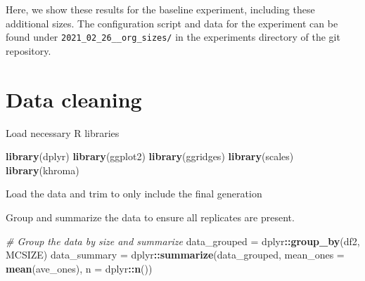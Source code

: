 \documentclass[
]{book}
\newenvironment{Shaded}{\begin{snugshade}}{\end{snugshade}}
\newcommand{\CommentTok}[1]{\textcolor[rgb]{0.56,0.35,0.01}{\textit{#1}}}
\newcommand{\DataTypeTok}[1]{\textcolor[rgb]{0.13,0.29,0.53}{#1}}
\newcommand{\DecValTok}[1]{\textcolor[rgb]{0.00,0.00,0.81}{#1}}
\newcommand{\KeywordTok}[1]{\textcolor[rgb]{0.13,0.29,0.53}{\textbf{#1}}}
\newcommand{\NormalTok}[1]{#1}
\newcommand{\OperatorTok}[1]{\textcolor[rgb]{0.81,0.36,0.00}{\textbf{#1}}}
\newcommand{\StringTok}[1]{\textcolor[rgb]{0.31,0.60,0.02}{#1}}
\begin{document}
Here, we show these results for the baseline experiment, including these additional sizes.
The configuration script and data for the experiment can be found under \texttt{2021\_02\_26\_\_org\_sizes/} in the experiments directory of the git repository.

\hypertarget{data-cleaning}{%
\section{Data cleaning}\label{data-cleaning}}

Load necessary R libraries

\begin{Shaded}
\begin{Highlighting}[]
\KeywordTok{library}\NormalTok{(dplyr)}
\KeywordTok{library}\NormalTok{(ggplot2)}
\KeywordTok{library}\NormalTok{(ggridges)}
\KeywordTok{library}\NormalTok{(scales)}
\KeywordTok{library}\NormalTok{(khroma)}
\end{Highlighting}
\end{Shaded}

Load the data and trim to only include the final generation

\begin{Shaded}
\end{Shaded}

Group and summarize the data to ensure all replicates are present.

\begin{Shaded}
\begin{Highlighting}[]
\CommentTok{\# Group the data by size and summarize}
\NormalTok{data\_grouped =}\StringTok{ }\NormalTok{dplyr}\OperatorTok{::}\KeywordTok{group\_by}\NormalTok{(df2, MCSIZE)}
\NormalTok{data\_summary =}\StringTok{ }\NormalTok{dplyr}\OperatorTok{::}\KeywordTok{summarize}\NormalTok{(data\_grouped, }\DataTypeTok{mean\_ones =} \KeywordTok{mean}\NormalTok{(ave\_ones), }\DataTypeTok{n =}\NormalTok{ dplyr}\OperatorTok{::}\KeywordTok{n}\NormalTok{())}
\end{Highlighting}
\end{Shaded}
\end{document}
